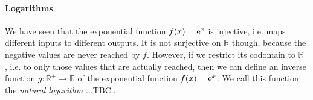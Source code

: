 \paragraph{Logarithms}
We have seen that the exponential function $f(x) = \operatorname{\mathrm{e}}^x$ is injective, i.e. maps different inputs to different outputs. It is not surjective on $\mathbb{R}$ though, because the negative values are never reached by $f$. However, if we restrict its codomain to $\mathbb{R}^+$, i.e. to only those values that are actually reached, then we can define an inverse function $g: \mathbb{R}^+ \rightarrow \mathbb{R}$ of the exponential function $f(x) = \operatorname{\mathrm{e}}^x$. We call this function the \emph{natural logarithm} ...TBC...





